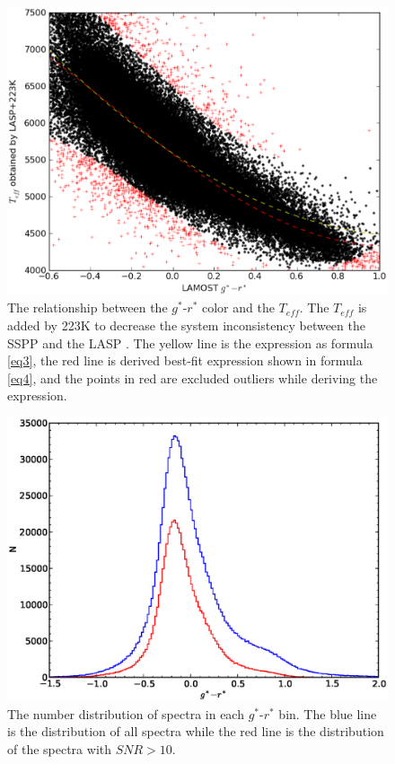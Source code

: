 \documentclass[manuscript]{aastex}
\begin{document}
   \begin{figure}
   \centering
   \includegraphics[width=14cm, angle=0,clip]{f3.eps}
   \caption{The relationship between the $g^*$-$r^*$  color and the $T_{eff}$.
   The $T_{eff}$ is added by 223K to decrease the system inconsistency between the SSPP and the LASP \citep{wu2011automatic}.
    The yellow line is the expression as formula \ref{eq3},
     the red line is  derived best-fit expression shown in formula \ref{eq4},
     and the points in red are excluded outliers while deriving the expression.   }
   \label{Fig3}
   \end{figure}

    \begin{figure}
   \centering
   \includegraphics[width=14cm, angle=0,clip]{f2.eps}
   \caption{The number distribution of spectra in each $g^*$-$r^*$ bin.
   The blue line is the distribution of all spectra while the red line is the distribution of the spectra with $SNR>10$.
   }
   \label{Fig4}
   \end{figure}
\end{document}
